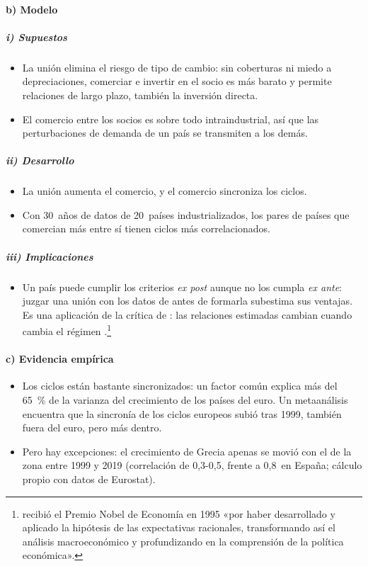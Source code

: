 \documentclass[11pt]{article}
\begin{document}
\paragraph{b) Modelo}

\subparagraph{i) Supuestos}

\begin{itemize}
\item La unión elimina el riesgo de tipo de cambio: sin coberturas ni miedo a depreciaciones, comerciar e invertir en el socio es más barato y permite relaciones de largo plazo, también la inversión directa.
\item El comercio entre los socios es sobre todo intraindustrial, así que las perturbaciones de demanda de un país se transmiten a los demás.
\end{itemize}

\subparagraph{ii) Desarrollo}

\begin{itemize}
\item La unión aumenta el comercio, y el comercio sincroniza los ciclos.
\item Con 30~años de datos de 20~países industrializados, los pares de países que comercian más entre sí tienen ciclos más correlacionados\nocite{FrankelRose1998Endogeneity}.
\end{itemize}

\subparagraph{iii) Implicaciones}

\begin{itemize}
\item Un país puede cumplir los criterios \emph{ex post} aunque no los cumpla \emph{ex ante}: juzgar una unión con los datos de antes de formarla subestima sus ventajas. Es una aplicación de la crítica de : las relaciones estimadas cambian cuando cambia el régimen .\footnote{ recibió el Premio Nobel de Economía en 1995 «por haber desarrollado y aplicado la hipótesis de las expectativas racionales, transformando así el análisis macroeconómico y profundizando en la comprensión de la política económica»\nocite{Nobel1995Lucas}.}
\end{itemize}

\paragraph{c) Evidencia empírica}

\begin{itemize}
\item Los ciclos están bastante sincronizados: un factor común explica más del 65~\% de la varianza del crecimiento de los países del euro\nocite{BCE2018Sincronizacion}. Un metaanálisis encuentra que la sincronía de los ciclos europeos subió tras 1999, también fuera del euro, pero más dentro\nocite{CamposFidrmucKorhonen2019}.
\item Pero hay excepciones: el crecimiento de Grecia apenas se movió con el de la zona entre 1999 y 2019 (correlación de 0,3-0,5, frente a 0,8~en España; cálculo propio con datos de Eurostat)\nocite{Eurostat2026Nama10gdp}.
\end{itemize}
\end{document}
